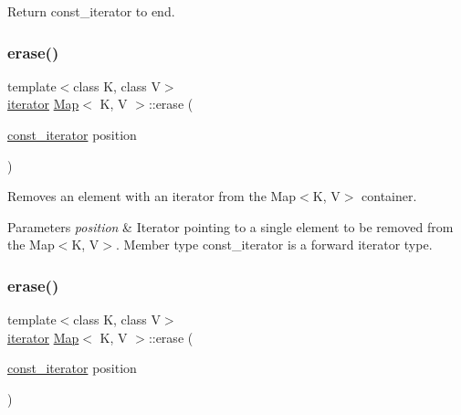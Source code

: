 Return const\+\_\+iterator to end. \mbox{\label{classMap_ac6710b6bb8d3a2204a88c3f6b0eee1f2}} 
\subsubsection{\texorpdfstring{erase()}{erase()}\hspace{0.1cm}{\footnotesize\ttfamily [1/6]}}
{\footnotesize\ttfamily template$<$class K, class V$>$ \\
\hyperlink{classMap_ad1f372a2028b9f46497e873b0e984e84}{iterator} \hyperlink{classMap}{Map}$<$ K, V $>$\+::erase (\begin{DoxyParamCaption}\item[{\hyperlink{classMap_add90fe1e25806ba6f6278b264e78ee9a}{const\+\_\+iterator}}]{position }\end{DoxyParamCaption})\hspace{0.3cm}{\ttfamily [inline]}}

Removes an element with an iterator from the Map$<$\+K, V$>$ container.


\begin{DoxyParams}{Parameters}
{\em position} & Iterator pointing to a single element to be removed from the Map$<$\+K, V$>$. Member type const\+\_\+iterator is a forward iterator type. \\
\hline
\end{DoxyParams}
\mbox{\label{classMap_ac6710b6bb8d3a2204a88c3f6b0eee1f2}} 
\subsubsection{\texorpdfstring{erase()}{erase()}\hspace{0.1cm}{\footnotesize\ttfamily [2/6]}}
{\footnotesize\ttfamily template$<$class K, class V$>$ \\
\hyperlink{classMap_ad1f372a2028b9f46497e873b0e984e84}{iterator} \hyperlink{classMap}{Map}$<$ K, V $>$\+::erase (\begin{DoxyParamCaption}\item[{\hyperlink{classMap_add90fe1e25806ba6f6278b264e78ee9a}{const\+\_\+iterator}}]{position }\end{DoxyParamCaption})\hspace{0.3cm}{\ttfamily [inline]}}

